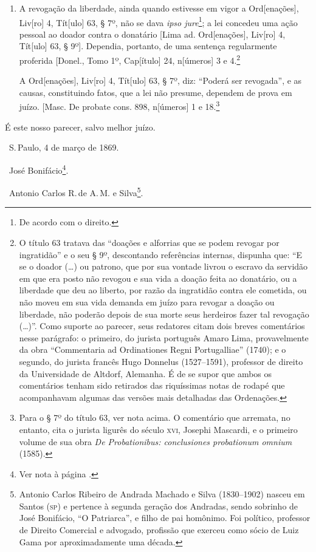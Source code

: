 \begin{enumerate}[label=Ao \arabic*º]
\item A revogação da liberdade, ainda quando estivesse em vigor a
Ord{[}enações{]}, Liv{[}ro{]} 4, Tít{[}ulo{]} 63, § 7º, não se dava
\emph{ipso jure}\footnote{De acordo com o direito.}; a lei concedeu
uma ação pessoal ao doador contra o donatário {[}Lima ad.
Ord{[}enações{]}, Liv{[}ro{]} 4, Tít{[}ulo{]} 63, § 9º{]}. Dependia,
portanto, de uma sentença regularmente proferida {[}Donel., Tomo 1º,
Cap{[}ítulo{]} 24, n{[}úmeros{]} 3 e 4.\footnote{O título 63 tratava
  das ``doações e alforrias que se podem revogar por ingratidão'' e o seu
  § 9º, descontando referências internas, dispunha que: ``E se o doador
  (\ldots{}) ou patrono, que por sua vontade livrou o escravo da servidão em
  que era posto não revogou e sua vida a doação feita ao donatário, ou a
  liberdade que deu ao liberto, por razão da ingratidão contra ele
  cometida, ou não moveu em sua vida demanda em juízo para revogar a
  doação ou liberdade, não poderão depois de sua morte seus herdeiros
  fazer tal revogação (\ldots{})''. Como suporte ao parecer, seus redatores
  citam dois breves comentários nesse parágrafo: o primeiro, do jurista
  português Amaro Lima, provavelmente da obra ``Commentaria ad
  Ordinationes Regni Portugalliae'' (1740); e o segundo, do jurista
  francês Hugo Donnelus (1527--1591), professor de direito da
  Universidade de Altdorf, Alemanha. É de se supor que ambos os
  comentários tenham sido retirados das riquíssimas notas de rodapé que
  acompanhavam algumas das versões mais detalhadas das Ordenações.}

A Ord{[}enações{]}, Liv{[}ro{]} 4, Tít{[}ulo{]} 63, § 7º, diz: ``Poderá
ser revogada'', e as causas, constituindo fatos, que a lei não presume,
dependem de prova em juízo. {[}Masc. De probate cons. 898, n{[}úmeros{]}
1 e 18.\footnote{Para o § 7º do título 63, ver nota acima. O
  comentário que arremata, no entanto, cita o jurista ligurês do século
  \textsc{xvi}, Josephi Mascardi, e o primeiro volume de sua obra \emph{De
  Probationibus: conclusiones probationum omnium} (1585).}
\end{enumerate}

É este nosso parecer, salvo melhor juízo.

\hfill\ S.\,Paulo, 4 de março de 1869.\smallskip

\hfill\ José Bonifácio\footnote{Ver nota à página \pageref{bonifacio}.}.

\hfill\ Antonio Carlos R.\,de A.\,M. e Silva\footnote{Antonio Carlos Ribeiro de
  Andrada Machado e Silva (1830--1902) nasceu em Santos (\textsc{sp}) e pertence à
  segunda geração dos Andradas, sendo sobrinho de José Bonifácio, ``O
  Patriarca'', e filho de pai homônimo. Foi político, professor de \label{machado}
  Direito Comercial e advogado, profissão que exerceu como sócio de Luiz
  Gama por aproximadamente uma década.}.


